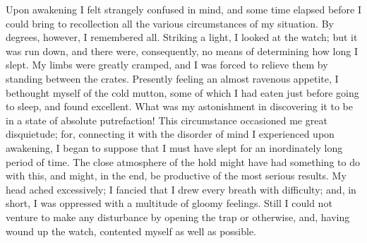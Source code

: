 Upon awakening I felt strangely confused in mind, and some time elapsed
before I could bring to recollection all the various circumstances of my
situation. By degrees, however, I remembered all. Striking a light, I looked at
the watch; but it was run down, and there were, consequently, no means of
determining how long I slept. My limbs were greatly cramped, and I was forced to
relieve them by standing between the crates. Presently feeling an almost
ravenous appetite, I bethought myself of the cold mutton, some of which I had
eaten just before going to sleep, and found excellent. What was my astonishment
in discovering it to be in a state of absolute putrefaction! This circumstance
occasioned me great disquietude; for, connecting it with the disorder of mind I
experienced upon awakening, I began to suppose that I must have slept for an
inordinately long period of time. The close atmosphere of the hold might have
had something to do with this, and might, in the end, be productive of the most
serious results. My head ached excessively; I fancied that I drew every breath
with difficulty; and, in short, I was oppressed with a multitude of gloomy
feelings. Still I could not venture to make any disturbance by opening the trap
or otherwise, and, having wound up the watch, contented myself as well as
possible. 

